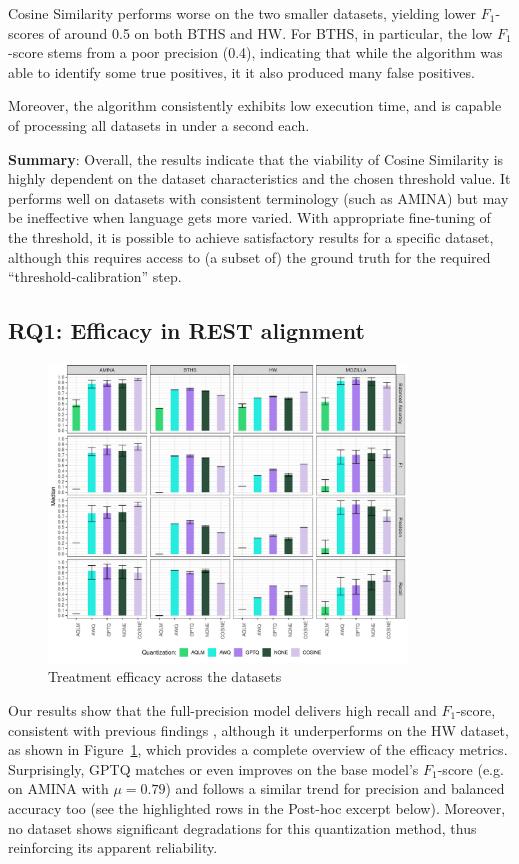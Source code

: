 \documentclass[conference]{IEEEtran}
\begin{document}
Cosine Similarity performs worse on the two smaller datasets, yielding lower $F_1$-scores of around 0.5 on both BTHS and HW. For BTHS, in particular, the low $F_1$-score stems from a poor precision (0.4), indicating that while the algorithm was able to identify some true positives, it it also produced many false positives.

Moreover, the algorithm consistently exhibits low execution time, and is capable of processing all datasets in under a second each.

\textbf{Summary}: Overall, the results indicate that the viability of Cosine Similarity is highly dependent on the dataset characteristics and the chosen threshold value. It performs well on datasets with consistent terminology (such as AMINA) but may be ineffective when language gets more varied. With appropriate fine-tuning of the threshold, it is possible to achieve satisfactory results for a specific dataset, although this requires access to (a subset of) the ground truth for the required ``threshold-calibration'' step.

\subsection{\textbf{RQ1: Efficacy in REST alignment}}

\begin{figure}[ht]
    \centering
    \includegraphics[width=0.85\textwidth]{images/RQ1_Bar_Plot.pdf}
    \caption{Treatment efficacy across the datasets}
    \label{fig:rq1}
\end{figure}

Our results show that the full-precision model delivers high recall and $F_1$-score, consistent with previous findings \cite{quinstedt2024Optimizing}, although it underperforms on the HW dataset, as shown in Figure~\ref{fig:rq1}, which provides a complete overview of the efficacy metrics. Surprisingly, GPTQ matches or even improves on the base model's $F_1$-score (e.g. on AMINA with $\mu = 0.79$) and follows a similar trend for precision and balanced accuracy too (see the highlighted rows in the Post-hoc excerpt below). Moreover, no dataset shows significant degradations for this quantization method, thus reinforcing its apparent reliability.
\end{document}
